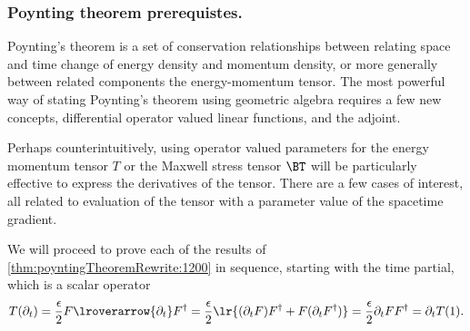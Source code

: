 %
%
\subsubsection{Poynting theorem prerequistes.}
Poynting's theorem is a set of conservation relationships between relating space and time change of energy density and momentum density, or more generally between related components the energy-momentum tensor.
The most powerful way of stating Poynting's theorem using geometric algebra requires a few new concepts, differential operator valued linear functions, and the adjoint.


Perhaps counterintuitively, using operator valued parameters for the energy momentum tensor \( T \) or the Maxwell stress tensor \( \BT \) will be particularly effective to express the derivatives of the tensor.  There are a few cases of interest, all related to evaluation of the tensor with a parameter value of the spacetime gradient.

We will proceed to prove each of the results of
\cref{thm:poyntingTheoremRewrite:1200} in sequence, starting with the time partial, which is a scalar operator
\begin{dmath}\label{eqn:poyntingTheoremRewrite:1220}
T(\partial_t)
=
\frac{\epsilon}{2}
 F \lroverarrow{\partial_t} F^\dagger
=
\frac{\epsilon}{2}
\lr{
 (\partial_t F) F^\dagger
+
 F (\partial_t F^\dagger)
}
=
\frac{\epsilon}{2}
\partial_t
 F F^\dagger
=
\partial_t T(1).
\end{dmath}

